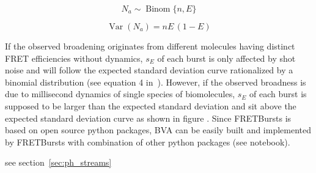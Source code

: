 \begin{equation}
\label{eq:binom_dist}
N_a \sim \operatorname{Binom} \{n, E\}
\end{equation}

\begin{equation}
\label{eq:binom_std}
\operatorname{Var}(N_a) = n E\,(1 - E)
\end{equation}

If the observed broadening originates from different molecules having distinct FRET efficiencies without dynamics, $s_E$ of each burst is only affected by shot noise and will follow the expected standard deviation curve rationalized by a binomial distribution (see equation 4 in~\cite{Torella_2011}). However, if the observed broadness is due to millisecond dynamics of single species of biomolecules, $s_E$ of each burst is supposed to be larger than the expected standard deviation and sit above the expected standard deviation curve as shown in figure .
Since FRETBursts is based on open source python packages, BVA can be easily built and implemented by FRETBursts with combination of other python packages (see notebook).  



see section~\ref{sec:ph_streams}